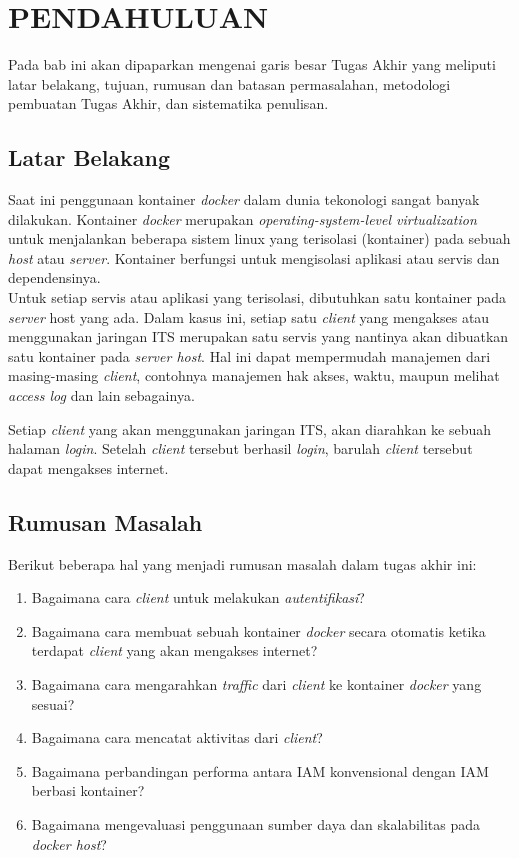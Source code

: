 \chapter{PENDAHULUAN}
  Pada bab ini akan dipaparkan mengenai garis besar Tugas Akhir yang meliputi latar belakang, tujuan, rumusan dan batasan permasalahan, metodologi pembuatan Tugas Akhir, dan sistematika penulisan.
  
  \section{Latar Belakang}
    Saat ini penggunaan kontainer \textit{docker} dalam dunia tekonologi sangat banyak dilakukan. Kontainer \textit{docker} merupakan \textit{operating-system-level virtualization} untuk menjalankan beberapa sistem linux yang terisolasi (kontainer) pada sebuah \textit{host} atau \textit{server}. Kontainer berfungsi untuk mengisolasi aplikasi atau servis dan dependensinya.\\
	\indent Untuk setiap servis atau aplikasi yang terisolasi, dibutuhkan satu kontainer pada \textit{server} host yang ada. Dalam kasus ini, setiap satu \textit{client} yang mengakses atau menggunakan jaringan ITS merupakan satu servis yang nantinya akan dibuatkan satu kontainer pada \textit{server host}. Hal ini dapat mempermudah manajemen dari masing-masing \textit{client}, contohnya manajemen hak akses, waktu, maupun melihat \textit{access log} dan lain sebagainya.
	
	Setiap \textit{client} yang akan menggunakan jaringan ITS, akan diarahkan ke sebuah halaman \textit{login}. Setelah \textit{client} tersebut berhasil \textit{login}, barulah \textit{client} tersebut dapat mengakses internet.

\section{Rumusan Masalah}
	Berikut beberapa hal yang menjadi rumusan masalah dalam tugas akhir ini:
	\begin{enumerate}
	 \item Bagaimana cara \textit{client} untuk melakukan \textit{autentifikasi}?
	 \item Bagaimana cara membuat sebuah kontainer \textit{docker} secara otomatis ketika terdapat \textit{client} yang akan mengakses internet?
	 \item Bagaimana cara mengarahkan \textit{traffic} dari \textit{client} ke kontainer \textit{docker} yang sesuai?
	 \item Bagaimana cara mencatat aktivitas dari \textit{client}?
	 \item Bagaimana perbandingan performa antara IAM konvensional dengan IAM berbasi kontainer?
	 \item Bagaimana mengevaluasi penggunaan sumber daya dan skalabilitas pada \textit{docker host}?
	\end{enumerate}

